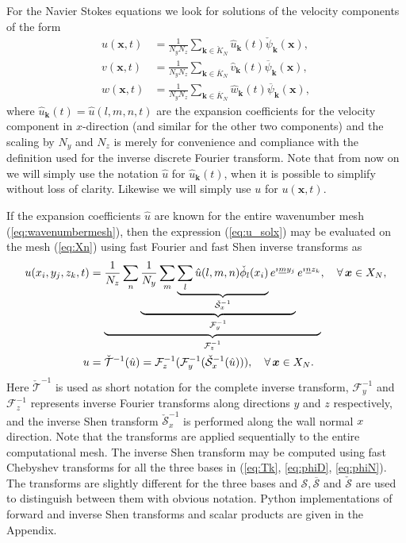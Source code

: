 \documentclass[11pt, oneside]{article}
\newcommand{\N}[1]{\check{#1}}
\newcommand{\D}[1]{\overline{#1}}
\begin{document}
For the Navier Stokes equations we look for solutions of the velocity 
components of the form
\begin{align}
u(\bm{x}, t) &= \frac{1}{N_yN_z}\sum_{\bm{k} \in \N{K}_N} \hat{u}_{\bm{k}}(t) 
\N{\psi}_{\bm{k}}(\bm{x}), \label{eq:u_solx} \\
v(\bm{x}, t) &= \frac{1}{N_yN_z}\sum_{\bm{k} \in \D{K}_N} \hat{v}_{\bm{k}}(t) 
\D{\psi}_{\bm{k}}(\bm{x}), \label{eq:u_soly} \\
w(\bm{x}, t) &= \frac{1}{N_yN_z}\sum_{\bm{k} \in \D{K}_N} \hat{w}_{\bm{k}}(t) 
\D{\psi}_{\bm{k}}(\bm{x}), \label{eq:u_solz}
\end{align}
where $\hat{u}_{\bm{k}}(t) = \hat{u}(l, {m}, {n}, t)$ are the expansion 
coefficients for the velocity component in $x$-direction (and similar for the 
other two components) and the scaling by $N_y$ and $N_z$ is merely for 
convenience 
and compliance with the definition used for the inverse discrete Fourier 
transform. Note that from now on we will simply use the notation $\hat{u}$ for 
$\hat{u}_{\bm{k}}(t)$, when it is possible to simplify without loss of clarity. 
Likewise we will simply use $u$ for $u(\bm{x}, t)$. 

If the expansion coefficients $\hat{u}$  are known for the entire wavenumber 
mesh (\ref{eq:wavenumbermesh}), then the expression (\ref{eq:u_solx}) may be 
evaluated on the mesh (\ref{eq:Xn}) using fast Fourier and fast Shen inverse 
transforms as
\begin{align}
u(x_i, y_j, z_k, t) &= \underbrace{\frac{1}{N_z}\sum_n 
\underbrace{\frac{1}{N_y} \sum_m \underbrace{\sum_l 
\hat{u}(l,m,n)\N{\phi}_l(x_i)}_{\N{\mathcal{S}}_x^{-1}} e^{\imath \underline{m} 
y_j}}_{\mathcal{F}_y^{-1}} e^{\imath \underline{n} z_k}}_{\mathcal{F}_z^{-1}} , 
\quad \forall \, \bm{x} \in X_N, \notag \\
  u &= \N{\mathcal{T}}^{-1}(\hat{u}) =  \mathcal{F}^{-1}_z (\mathcal{F}^{-1}_y 
  (\N{\mathcal{S}}^{-1}_x (\hat{u}))), \quad \forall \, \bm{x} \in X_N.  
  \label{eq:ifft} 
\end{align}
Here $\N{\mathcal{T}}^{-1}$ is used as short notation for the complete inverse 
transform, $\mathcal{F}_{y}^{-1}$ and $\mathcal{F}_{z}^{-1}$ represents inverse 
Fourier transforms along directions $y$ and $z$ respectively, and the inverse 
Shen transform $\N{\mathcal{S}}_{x}^{-1}$ is performed along the wall normal 
$x$ direction. Note that the transforms are applied sequentially to the entire 
computational mesh. The inverse Shen transform may be computed using fast 
Chebyshev transforms for all the three bases in (\ref{eq:Tk}, \ref{eq:phiD}, 
\ref{eq:phiN}). The transforms are slightly different for the three bases and 
${\mathcal{S}}, \D{\mathcal{S}}$ and $\N{\mathcal{S}}$ are used to distinguish 
between them with obvious notation. Python implementations of forward and 
inverse Shen transforms and scalar products are given in the Appendix.
\end{document}
